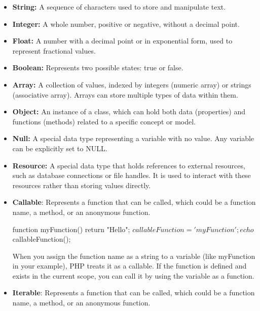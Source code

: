 \documentclass{report}
\begin{document}
\pagebreak 
{}
\bigbreak \noindent 
\begin{itemize}
    \item \textbf{String:} A sequence of characters used to store and manipulate text.
    \item \textbf{Integer:} A whole number, positive or negative, without a decimal point.
    \item \textbf{Float:} A number with a decimal point or in exponential form, used to represent fractional values.
    \item \textbf{Boolean:} Represents two possible states: true or false.
    \item \textbf{Array:}  A collection of values, indexed by integers (numeric array) or strings (associative array). Arrays can store multiple types of data within them.
    \item \textbf{Object:} An instance of a class, which can hold both data (properties) and functions (methods) related to a specific concept or model.
    \item \textbf{Null:} A special data type representing a variable with no value. Any variable can be explicitly set to NULL.
    \item \textbf{Resource:} A special data type that holds references to external resources, such as database connections or file handles. It is used to interact with these resources rather than storing values directly.
    \item \textbf{Callable}: Represents a function that can be called, which could be a function name, a method, or an anonymous function.
        \bigbreak \noindent 
        \begin{phpcode}
            function myFunction() { return "Hello"; }
            $callableFunction = 'myFunction';
            echo $callableFunction();
        \end{phpcode}
        \bigbreak \noindent 
        When you assign the function name as a string to a variable (like myFunction in your example), PHP treats it as a callable. If the function is defined and exists in the current scope, you can call it by using the variable as a function.
    \item \textbf{Iterable}: Represents a function that can be called, which could be a function name, a method, or an anonymous function.
        \bigbreak \noindent 
\end{itemize}
\end{document}
